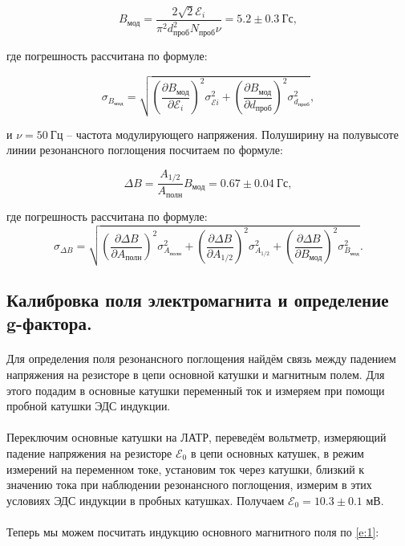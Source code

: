 \documentclass[a4paper,12pt]{article} %
\begin{document}
\[
B_{\text{мод}} = \dfrac{2\sqrt{2}\mathcal{E}_i}{\pi^2 d_{\text{проб}}^2 N_{\text{проб}}\nu} = 5.2 \pm 0.3~\text{Гс},
\]

\noindent где погрешность рассчитана по формуле:

\[
\sigma_{B_{\text{мод}}}=\sqrt{\left(\dfrac{\partial B_{\text{мод}}}{\partial \mathcal{E}_i} \right)^2 \sigma^2_{\mathcal{E}i} + \left(\dfrac{\partial B_{\text{мод}}}{\partial d_{\text{проб}}} \right)^2 \sigma^2_{d_{\text{проб}}}},
\]

\noindent и $\nu = 50~\text{Гц}$ -- частота модулирующего напряжения. Полуширину на полувысоте линии резонансного поглощения посчитаем по формуле:

\[
\Delta B = \dfrac{A_{1/2}}{A_{\text{полн}}} B_{\text{мод}} = 0.67 \pm 0.04~\text{Гс},
\]

\noindent где погрешность рассчитана по формуле:
\[\sigma_{\Delta B} = \sqrt{ \left(\dfrac{\partial \Delta B}{\partial A_{\text{полн}}} \right)^2 \sigma^2_{A_{\text{полн}}} +  \left(\dfrac{\partial \Delta B}{\partial A_{\text{1/2}}} \right)^2 \sigma^2_{A_{\text{1/2}}} + \left(\dfrac{\partial \Delta B}{\partial B_{\text{мод}}} \right)^2 \sigma^2_{B_{\text{мод}}} }.\]

\subsection{Калибровка поля электромагнита и определение g-фактора.}

\paragraph{}Для определения поля резонансного поглощения найдём связь между падением напряжения на резисторе в цепи основной катушки и магнитным полем. Для этого подадим в основные катушки переменный ток и измеряем при помощи пробной катушки
ЭДС индукции.

\paragraph{}Переключим основные катушки на ЛАТР, переведём вольтметр, измеряющий
падение напряжения на резисторе $\mathcal{E}_0$ в цепи основных катушек, в режим измерений на
переменном токе, установим ток через катушки, близкий к значению тока при наблюдении резонансного поглощения, измерим в этих условиях ЭДС индукции в пробных катушках. Получаем $\mathcal{E}_0 = 10.3 \pm 0.1$ мВ.

\paragraph{}Теперь мы можем посчитать индукцию основного магнитного поля по \eqref{e:1}:
\end{document}
